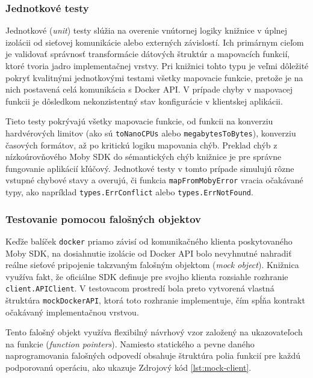 \documentclass[
 program=infpvs,
  language=slovak,
  figures=false,
  tables=false,
  sourcecodes,
  glossaries,
  index
]{kidiplom}
\begin{document}
{\subsubsection{Jednotkové testy}  \label{sec:unit-testy}
Jednotkové (\textit{unit}) testy slúžia na overenie vnútornej logiky knižnice v úplnej izolácii od sieťovej komunikácie alebo externých závislostí. Ich primárnym cieľom je validovať správnosť transformácie dátových štruktúr a mapovacích funkcií, ktoré tvoria jadro implementačnej vrstvy. Pri knižnici tohto typu je veľmi dôležité pokryť kvalitnými jednotkovými testami všetky mapovacie funkcie, pretože je na nich postavená celá komunikácia s Docker API. V prípade chyby v mapovacej funkcii je dôsledkom nekonzistentný stav konfigurácie v klientskej aplikácii.

Tieto testy pokrývajú všetky mapovacie funkcie, od funkcii na konverziu hardvérových limitov (ako sú \texttt{toNanoCPUs} alebo \texttt{megabytesToBytes}), konverziu časových formátov, až po kritickú logiku mapovania chýb. Preklad chýb z nízkoúrovňového Moby SDK do sémantických chýb knižnice je pre správne fungovanie aplikácií kľúčový. Jednotkové testy v tomto prípade simulujú rôzne vstupné chybové stavy a overujú, či funkcia \texttt{mapFromMobyError} vracia očakávané typy, ako napríklad \texttt{types.ErrConflict} alebo \texttt{types.ErrNotFound}.



\subsubsection{Testovanie pomocou falošných objektov}  \label{sec:mock-testy}
Keďže balíček \texttt{docker} priamo závisí od komunikačného klienta poskytovaného Moby SDK, na dosiahnutie izolácie od Docker API bolo nevyhnutné nahradiť reálne sieťové pripojenie takzvaným falošným objektom (\textit{mock object}). Knižnica využíva fakt, že oficiálne SDK definuje pre svojho klienta rozsiahle rozhranie \texttt{client.APIClient}. V testovacom prostredí bola preto vytvorená vlastná štruktúra \texttt{mockDockerAPI}, ktorá toto rozhranie implementuje, čím spĺňa kontrakt očakávaný implementačnou vrstvou.

Tento falošný objekt využíva flexibilný návrhový vzor založený na ukazovateľoch na funkcie (\textit{function pointers}). Namiesto statického a pevne daného naprogramovania falošných odpovedí obsahuje štruktúra polia funkcií pre každú podporovanú operáciu, ako ukazuje Zdrojový kód \ref{lst:mock-client}.

}
\end{document}
